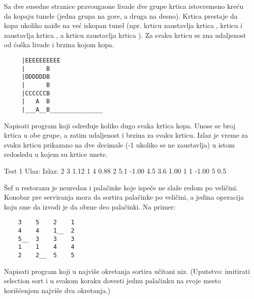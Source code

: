 \begin{Exercise}[label=515]
  Sa dve susedne stranice pravougaone livade dve grupe krtica
  istovremeno kreću da kopaju tunele (jedna grupa na gore, a druga na
  desno). Krtica prestaje da kopa ukoliko naiđe na već iskopan tunel
  (npr. krticu  zaustavlja krtica , krticu  i
   zaustavlja krtica , a krticu  zaustavlja
  krtica ). Za svaku krticu se zna udaljenost od ćoška livade
  i brzina kojom kopa.
\begin{verbatim}
     |EEEEEEEEEE
     |      B
     |DDDDDDB 
     |      B
     |CCCCCCB
     |   A  B
     |___A__B_______________
\end{verbatim}
Napisati program koji određuje koliko dugo svaka krtica kopa. Unose
se broj krtica u obe grupe, a zatim udaljenost i brzina za svaku
krticu. Izlaz je vreme za svaku krticu prikazano na dve decimale (-1
ukoliko se ne zaustavlja) u istom redosledu u kojem su krtice unete.

\begin{miditest}
\begin{test}{Test 1}
Ulaz:          Izlaz:
2 3            1.12
1   4          0.88
2   5.1        -1.00
4.5 3.6        1.00
1   1          -1.00
5   0.5
\end{test}
\end{miditest}
  
\end{Exercise}

\begin{Exercise}[label=516]
  Šef u restoranu je neuredan i palačinke koje ispeče ne slaže redom
  po veličini. Konobar pre serviranja mora da sortira palačinke po
  veličini, a jedina operacija koju sme da izvodi je da obrne deo
  palačinki. Na primer:
\begin{verbatim}
    3    5    2    1
    4    4    1__  2
    5__  3    3    3
    1    1    4    4
    2    2__  5    5
\end{verbatim}
Napisati program koji u najviše  okretanja sortira učitani
niz. (Uputstvo: imitirati selection sort i u svakom koraku dovesti
jednu palačinku na svoje mesto korišćenjem najviše dva okretanja.)
    
\end{Exercise}

